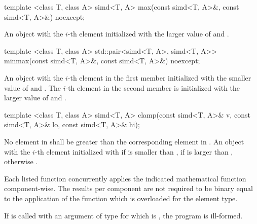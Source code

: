 \begin{itemdecl}
template <class T, class A>
simd<T, A> max(const simd<T, A>&, const simd<T, A>&) noexcept;
\end{itemdecl}
\begin{itemdescr}
  \pnum\returns An object with the $i$-th element initialized with the larger value of  and  \foralli.
\end{itemdescr}

\begin{itemdecl}
template <class T, class A>
std::pair<simd<T, A>, simd<T, A>> minmax(const simd<T, A>&,
                                               const simd<T, A>&) noexcept;
\end{itemdecl}
\begin{itemdescr}
  \pnum\returns An object with the $i$-th element in the first  member initialized with the smaller value of  and  \foralli.
  The $i$-th element in the second  member is initialized with the larger value of  and  \foralli.
\end{itemdescr}

\begin{itemdecl}
template <class T, class A>
simd<T, A> clamp(const simd<T, A>& v, const simd<T, A>& lo,
                    const simd<T, A>& hi);
\end{itemdecl}
\begin{itemdescr}
  \pnum\requires No element in  shall be greater than the corresponding element in .
  \pnum\returns An object with the $i$-th element initialized with  if  is smaller than ,  if  is larger than , otherwise  \foralli.
\end{itemdescr}



\pnum Each listed function concurrently applies the indicated mathematical function component-wise.
The results per component are not required to be binary equal to the application of the function which is overloaded for the element type.

\pnum If  is called with an argument of type \simd[<X, Abi>] for which  is \true, the program is ill-formed.

